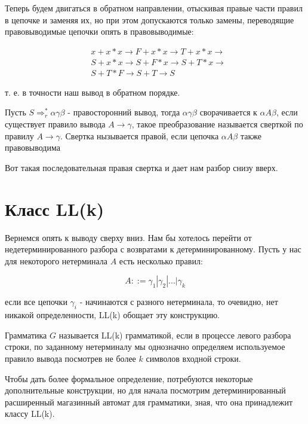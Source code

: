 Теперь будем двигаться в обратном направлении, отыскивая правые части правил в цепочке и заменяя их, но
при этом допускаются только замены, переводящие правовыводимые цепочки опять в правовыводимые:

\[
	\begin{split}
		& x + x * x \rightarrow F + x * x \rightarrow T + x * x \rightarrow \\
		& S + x * x \rightarrow S + F * x \rightarrow S + T * x \rightarrow \\
		& S + T * F \rightarrow S + T \rightarrow S
	\end{split}
\]

т. е. в точности наш вывод в обратном порядке.

\begin{Def}
Пусть $S \Rightarrow^*_r \alpha \gamma \beta$ - правосторонний вывод, тогда $\alpha \gamma \beta$ сворачивается
к $\alpha A \beta$, если существует правило вывода $A \rightarrow \gamma$, такое преобразование называется сверткой по правилу $A \rightarrow \gamma$. Свертка нызывается правой, если цепочка $\alpha A \beta$ также 
правовыводима
\end{Def}

Вот такая последовательная правая свертка и дает нам разбор снизу вверх.

\section{Класс LL(k)}

Вернемся опять к выводу сверху вниз. Нам бы хотелось перейти от недетерминированного разбора с возвратами к
детерминированному. Пусть у нас для некоторого нетерминала $A$ есть несколько правил:

$$ A ::= \gamma_1 | \gamma_2 | ... | \gamma_k $$

если все цепочки $\gamma_i$ - начинаются с разного нетерминала, то очевидно, нет никакой определенности, LL(k)
обощает эту конструкцию.

\begin{Def}
Грамматика $G$ называется LL(k) грамматикой, если в процессе левого разбора строки, по заданному нетерминалу мы однозначно определяем используемое правило вывода посмотрев не более $k$ символов входной строки.
\end{Def}

Чтобы дать более формальное определение, потребуются некоторые дополнительные конструкции, но для начала
посмотрим детерминированный расширенный магазинный автомат для грамматики, зная, что она принадлежит классу
LL(k).

